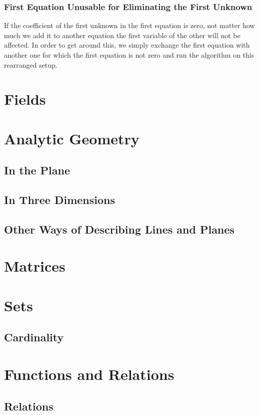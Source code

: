 \documentclass{article}
\begin{document}
	\subsubsection{First Equation Unusable for Eliminating the First Unknown}
	If the coefficient of the first unknown in the first equation is zero, not matter how much we add it to another equation the first variable of the other will not be affected. In order to get around this, we simply exchange the first equation with another one for which the first equation is not zero and run the algorithm on this rearranged setup.
	
	\section{Fields}
	
	\section{Analytic Geometry}
	\subsection{In the Plane}
	\subsection{In Three Dimensions}
	\subsection{Other Ways of Describing Lines and Planes}
	
	\section{Matrices}
	
	\section{Sets}
	\subsection{Cardinality}

	\section{Functions and Relations}
	\subsection{Relations}
\end{document}
